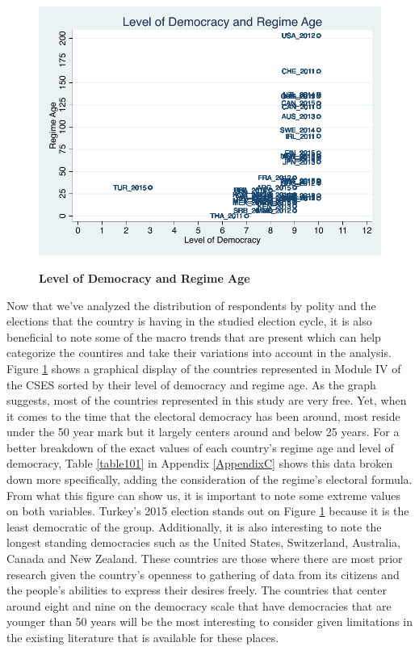 \documentclass[12pt, titlepage]{article}
\newcommand\tb{\textbf}
\begin{document}
\begin{figure}[ht!]    \centering
	{	 \includegraphics[width=\textwidth]{DemAge}}
	\caption{\tb{Level of Democracy and Regime Age}}\label{figure2}
\end{figure}

Now that we've analyzed the distribution of respondents by polity and the elections that the country is having in the studied election cycle, it is also beneficial to note some of the macro trends that are present which can help categorize the countires and take their variations into account in the analysis. Figure \ref{figure2} shows a graphical display of the countries represented in Module IV of the CSES sorted by their level of democracy and regime age. As the graph suggests, most of the countries represented in this study are very free. Yet, when it comes to the time that the electoral democracy has been around, most reside under the 50 year mark but it largely centers around and below 25 years. For a better breakdown of the exact values of each country's regime age and level of democracy, Table \ref{table101} in Appendix \ref{AppendixC} shows this data broken down more specifically, adding the consideration of the regime's electoral formula. From what this figure can show us, it is important to note some extreme values on both variables. Turkey's 2015 election stands out on Figure \ref{figure2} because it is the least democratic of the group. Additionally, it is also interesting to note the longest standing democracies such as the United States, Switzerland, Australia, Canada and New Zealand. These countries are those where there are most prior research given the country's openness to gathering of data from its citizens and the people's abilities to express their desires freely. The countries that center around eight and nine on the democracy scale that have democracies that are younger than 50 years will be the most interesting to consider given limitations in the existing literature that is available for these places.
\end{document}
